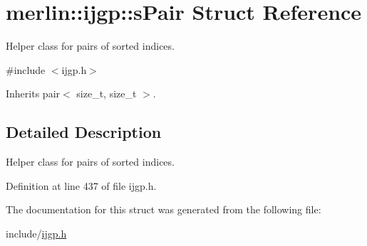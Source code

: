 \hypertarget{structmerlin_1_1ijgp_1_1sPair}{}\section{merlin\+:\+:ijgp\+:\+:s\+Pair Struct Reference}
\label{structmerlin_1_1ijgp_1_1sPair}


Helper class for pairs of sorted indices.  




{\ttfamily \#include $<$ijgp.\+h$>$}



Inherits pair$<$ size\+\_\+t, size\+\_\+t $>$.



\subsection{Detailed Description}
Helper class for pairs of sorted indices. 

Definition at line 437 of file ijgp.\+h.



The documentation for this struct was generated from the following file\+:\begin{DoxyCompactItemize}
\item 
include/\hyperlink{ijgp_8h}{ijgp.\+h}\end{DoxyCompactItemize}
